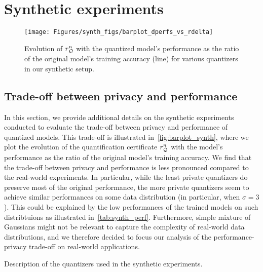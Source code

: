 \newpage

\section{Synthetic experiments}
\label{app:synthetic_details}

\begin{wrapfigure}[28]{r}{0.53\linewidth}
    \centering
    \texttt{[image: Figures/synth\_figs/barplot\_dperfs\_vs\_rdelta]}
    \caption{
        Evolution of $r_{{\mathcal{Q}}}^n$ with the quantized model's performance as the ratio of the original model's training accuracy (line) for various quantizers in our synthetic setup.
    }
    \label{fig:barplot_synth}
\end{wrapfigure}

\subsection{Trade-off between privacy and performance}

In this section, we provide additional details on the synthetic experiments conducted to evaluate the trade-off between privacy and performance of quantized models.
This trade-off is illustrated in~\autoref{fig:barplot_synth}, where we plot the evolution of the quantification certificate $r_{{\mathcal{Q}}}^n$ with the model's performance as the ratio of the original model's training accuracy.
We find that the trade-off between privacy and performance is less pronounced compared to the real-world experiments.
In particular, while the least private quantizers do preserve most of the original performance, the more private quantizers seem to achieve similar performances on some data distribution (in particular, when $\sigma = 3$).
This could be explained by the low performances of the trained models on such distribtuions as illustrated in~\autoref{tab:synth_perf}.
Furthermore, simple mixture of Gaussians might not be relevant to capture the complexity of real-world data distributions, and we therefore decided to focus our analysis of the performance-privacy trade-off on real-world applications.

\begin{table}
    \centering
    \caption{
        Description of the quantizers used in the synthetic experiments.
    }
    \label{tab:synth_perf}
    \resizebox{\linewidth}{!}{}
\end{table}


